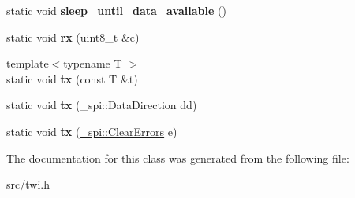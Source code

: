 \begin{DoxyCompactItemize}
static void {\bfseries sleep\+\_\+until\+\_\+data\+\_\+available} ()
\item 
\hypertarget{classTwiMaster_a6da3c235f05a261b995914b239a6014e}{}\label{classTwiMaster_a6da3c235f05a261b995914b239a6014e} 
static void {\bfseries rx} (uint8\+\_\+t \&c)
\item 
\hypertarget{classTwiMaster_ae84b9159bf0d1b92309b52530e66719b}{}\label{classTwiMaster_ae84b9159bf0d1b92309b52530e66719b} 
{\footnotesize template$<$typename T $>$ }\\static void {\bfseries tx} (const T \&t)
\item 
\hypertarget{classTwiMaster_a82f5505751ac58f5b69f16256352e06a}{}\label{classTwiMaster_a82f5505751ac58f5b69f16256352e06a} 
static void {\bfseries tx} (\+\_\+spi\+::\+Data\+Direction dd)
\item 
\hypertarget{classTwiMaster_a8faae53ff4d560d547027cffa9f09b85}{}\label{classTwiMaster_a8faae53ff4d560d547027cffa9f09b85} 
static void {\bfseries tx} (\hyperlink{class__transmission_1_1ClearErrors}{\+\_\+spi\+::\+Clear\+Errors} e)
\end{DoxyCompactItemize}


The documentation for this class was generated from the following file\+:\begin{DoxyCompactItemize}
\item 
src/twi.\+h\end{DoxyCompactItemize}
